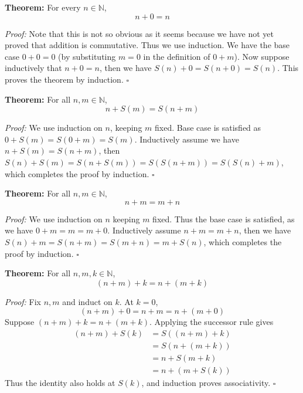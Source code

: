 \documentclass[a4paper,11pt,abstracton]{scrartcl}
\newcommand{\NN}{\mathbb{N}}
\theoremstyle{dotlessP}
\theoremstyle{dotlessS}
\theoremstyle{remark}
\theoremstyle{definition}
\begin{document}
\begin{problem_box}
\textbf{Theorem:}
For every $n\in\NN$,
\[
    n+0=n
\]
\end{problem_box}

\begin{claim_box}
\textit{Proof:} 
Note that this is not so obvious as it seems because we have not yet proved that addition is commutative. Thus we use induction. We have the base case $0+0=0$ (by substituting $m=0$ in the definition of $0+m$). Now suppose inductively that $n+0=n$, then we have $S(n)+0=S(n+0)=S(n)$. This proves the theorem by induction.
\hfill$\square$
\end{claim_box}

\begin{problem_box}
\textbf{Theorem:}
For all $n,m\in\NN$,
\[
    n+S(m)=S(n+m)
\]
\end{problem_box}

\begin{claim_box}
\textit{Proof:}
We use induction on $n$, keeping $m$ fixed. Base case is satisfied as $0+S(m)=S(0+m)=S(m)$. Inductively assume we have $n+S(m)=S(n+m)$, then $S(n)+S(m)=S(n+S(m))=S(S(n+m))=S(S(n)+m)$, which completes the proof by induction.
\hfill$\square$
\end{claim_box}

\begin{problem_box}
\textbf{Theorem:}
For all $n,m\in\NN$,
\[
    n+m=m+n
\]
\end{problem_box}

\begin{claim_box}
\textit{Proof:}
We use induction on $n$ keeping $m$ fixed. Thus the base case is satisfied, as we have $0+m = m = m+0$. Inductively assume $n+m=m+n$, then we have $S(n)+m = S(n+m) = S(m+n) = m + S(n)$, which completes the proof by induction.
\hfill$\square$
\end{claim_box}

\begin{problem_box}
\textbf{Theorem:}
For all $n,m,k\in\NN$,
\[
    (n+m)+k=n+(m+k)
\]
\end{problem_box}

\begin{claim_box}
\textit{Proof:}
Fix $n,m$ and induct on $k$. At $k=0$,
\[
    (n+m)+0=n+m=n+(m+0)
\]
Suppose $(n+m)+k=n+(m+k)$. Applying the successor rule gives
\[
\begin{aligned}
    (n+m)+S(k)
    &=S((n+m)+k)\\
    &=S(n+(m+k))\\
    &=n+S(m+k)\\
    &=n+(m+S(k))
\end{aligned}
\]
Thus the identity also holds at $S(k)$, and induction proves
associativity.
\hfill$\square$
\end{claim_box}
\end{document}
